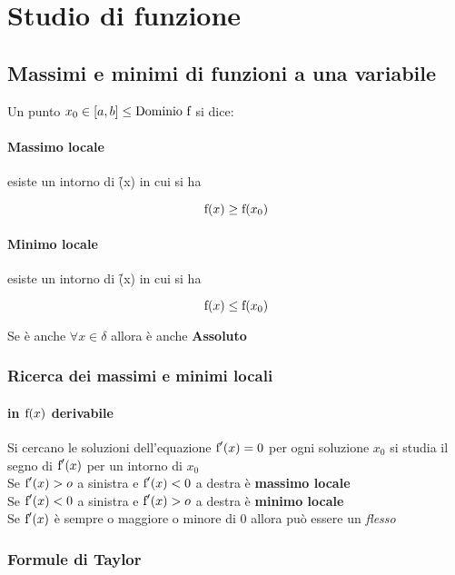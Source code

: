 
\section{Studio di funzione}	
	 	
	 	\subsection{Massimi e minimi di funzioni a una variabile}
	 	
	 	Un punto $x_0\in[a,b]\leq \text{Dominio \text{f}}$ si dice:\\
	 	
		\paragraph{Massimo locale} esiste un intorno di \f(x) in cui si ha 
		
		\[
		\text{f}(x)\geq\text{\text{f}}(x_0)
		\]
		
		\paragraph{Minimo locale} esiste un intorno di \f(x) in cui si ha
		
		\[
		\text{f}(x)\leq \text{\text{f}}(x_0)
		\]
		
		Se è anche $\forall x \in \delta$ allora è anche 
		\textbf{Assoluto}
		
		\subsubsection{Ricerca dei massimi e minimi locali}
		
		\paragraph{in $\text{f}(x)$ derivabile}
		
		Si cercano le soluzioni dell'equazione ${\text{f}}'(x)=0$ per ogni soluzione $x_0$ si studia il segno di ${\text{f}}'(x)$ per un intorno di $x_0$\\
		Se ${\text{f}}'(x)>o$ a sinistra e ${\text{f}}'(x)<0$ a destra è \textbf{massimo locale}\\
		Se ${\text{f}}'(x)<0$ a sinistra e ${\text{f}}'(x)>o$ a destra è \textbf{minimo locale}\\
		Se ${\text{f}}'(x)$ è sempre o maggiore o minore di 0 allora può essere un \textit{flesso}
		
		\subsubsection{Formule di Taylor}
		

